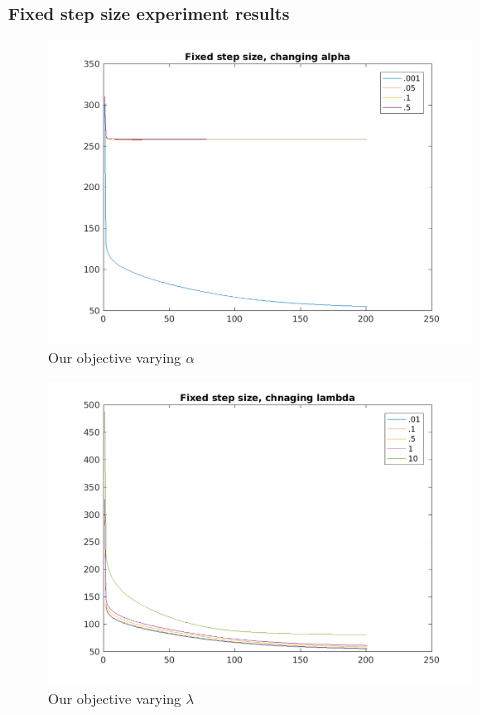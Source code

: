 \documentclass{article}
\newcommand{\0}{\mathrm{0}}
\newcommand{\1}{\mathrm{1}}
\newcommand{\red}[1]{{\color{red}{#1}}}
\begin{document}
\subsubsection{Fixed step size experiment results}
\red{TODO: clean up}


\begin{figure}
  \includegraphics[width=\textwidth]{fixed-step-alpha.png}
  \caption{Our objective varying $\alpha$}
\end{figure}

\begin{figure}
  \includegraphics[width=\textwidth]{fixed-step-lambda.png}
  \caption{Our objective varying $\lambda$}
\end{figure}
\end{document}
